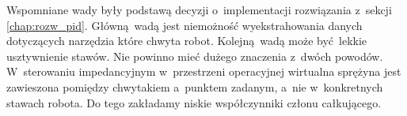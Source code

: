 Wspomniane wady były podstawą decyzji o~implementacji rozwiązania z~sekcji \ref{chap:rozw_pid}. Główną wadą jest niemożność wyekstrahowania danych dotyczących narzędzia które chwyta robot. Kolejną wadą może być lekkie usztywnienie stawów. Nie powinno mieć dużego znaczenia z~dwóch powodów. W~sterowaniu impedancyjnym w~przestrzeni operacyjnej wirtualna sprężyna jest zawieszona pomiędzy chwytakiem a~punktem zadanym, a~nie w~konkretnych stawach robota. Do tego zakładamy niskie współczynniki członu całkującego.








